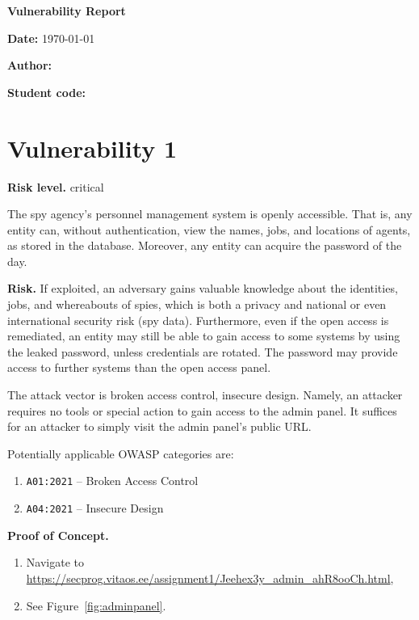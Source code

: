 \documentclass[parskip=half]{scrartcl}
\newcommand{\figref}[1]{Figure~\ref{#1}}
\begin{document}
{\LARGE \textbf{\textsf{Vulnerability Report}}}
\vspace*{1em}

\textbf{Date:} \today

\textbf{Author:} \docauthor

\textbf{Student code:} \texttt{\studentcode}

\section*{Vulnerability 1}

\textbf{Risk level.} critical

The spy agency's personnel management system is openly accessible. That is, any
entity can, without authentication, view the names, jobs, and locations of
agents, as stored in the database. Moreover, any entity can acquire the password
of the day.

\textbf{Risk.} If exploited, an adversary gains valuable knowledge about the
identities, jobs, and whereabouts of spies, which is both a privacy and national
or even international security risk (spy data). Furthermore, even if the open
access is remediated, an entity may still be able to gain access to some systems
by using the leaked password, unless credentials are rotated. The password may
provide access to further systems than the open access panel.

The attack vector is broken access control, insecure design. Namely, an attacker
requires no tools or special action to gain access to the admin panel. It
suffices for an attacker to simply visit the admin panel's public URL.

Potentially applicable OWASP categories are:
\begin{enumerate}
  \item \texttt{A01:2021} -- Broken Access Control%
  \item \texttt{A04:2021} -- Insecure Design%
\end{enumerate}

\textbf{Proof of Concept.}

\begin{enumerate}
  \item Navigate to\\
  \url{https://secprog.vitaos.ee/assignment1/Jeehex3y_admin_ahR8ooCh.html},
  \item See \figref{fig:adminpanel}.
\end{enumerate}
\end{document}
